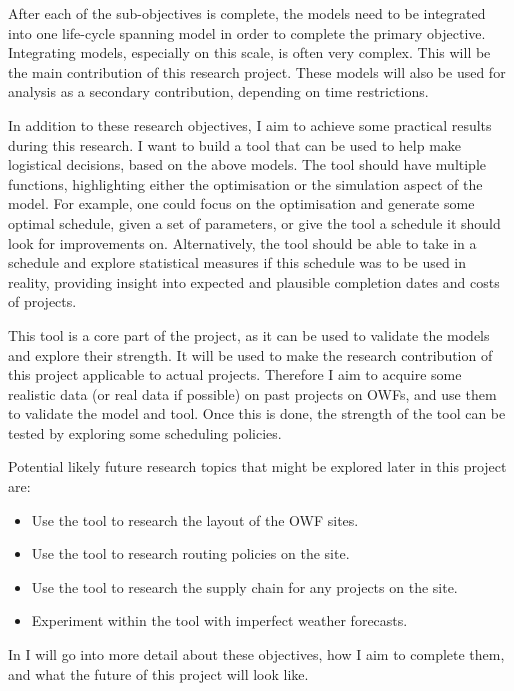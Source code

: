 \documentclass[a4paper,12pt]{article}
\begin{document}
After each of the sub-objectives is complete, the models need to be integrated into one life-cycle spanning model in order to complete the primary objective. Integrating models, especially on this scale, is often very complex. This will be the main contribution of this research project. These models will also be used for analysis as a secondary contribution, depending on time restrictions.

\bigskip

In addition to these research objectives, I aim to achieve some practical results during this research. I want to build a tool that can be used to help make logistical decisions, based on the above models. The tool should have multiple functions, highlighting either the optimisation or the simulation aspect of the model. For example, one could focus on the optimisation and generate some optimal schedule, given a set of parameters, or give the tool a schedule it should look for improvements on. Alternatively, the tool should be able to take in a schedule and explore statistical measures if this schedule was to be used in reality, providing insight into expected and plausible completion dates and costs of projects. 

This tool is a core part of the project, as it can be used to validate the models and explore their strength. It will be used to make the research contribution of this project applicable to actual projects. Therefore I aim to acquire some realistic data (or real data if possible) on past projects on OWFs, and use them to validate the model and tool. Once this is done, the strength of the tool can be tested by exploring some scheduling policies. 

\bigskip

Potential likely future research topics that might be explored later in this project are:

\begin{itemize}
\item Use the tool to research the layout of the OWF sites.
\item Use the tool to research routing policies on the site.
\item Use the tool to research the supply chain for any projects on the site. 
\item Experiment within the tool with imperfect weather forecasts. 
\end{itemize}

In  I will go into more detail about these objectives, how I aim to complete them, and what the future of this project will look like.
\end{document}
